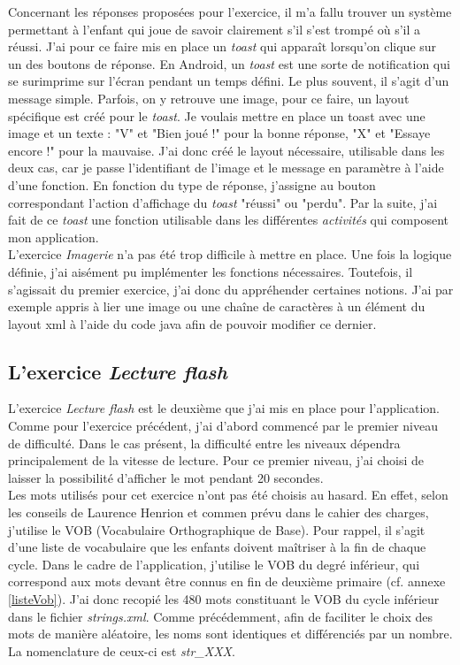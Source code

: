 Concernant les réponses proposées pour l'exercice, il m'a fallu trouver un système permettant à l'enfant qui joue de savoir clairement s'il s'est trompé où s'il a réussi. J'ai pour ce faire mis en place un \textit{toast} qui apparaît lorsqu'on clique sur un des boutons de réponse. En Android, un \textit{toast} est une sorte de notification qui se surimprime sur l'écran pendant un temps défini. Le plus souvent, il s'agit d'un message simple. Parfois, on y retrouve une image, pour ce faire, un layout spécifique est créé pour le \textit{toast}. Je voulais mettre en place un toast avec une image et un texte : "V" et "Bien joué !" pour la bonne réponse, "X" et "Essaye encore !" pour la mauvaise. J'ai donc créé le layout nécessaire, utilisable dans les deux cas, car je passe l'identifiant de l'image et le message en paramètre à l'aide d'une fonction. En fonction du type de réponse, j'assigne au bouton correspondant l'action d'affichage du \textit{toast} "réussi" ou "perdu". Par la suite, j'ai fait de ce \textit{toast} une fonction utilisable dans les différentes \textit{activités} qui composent mon application.\\

L'exercice \textit{Imagerie} n'a pas été trop difficile à mettre en place. Une fois la logique définie, j'ai aisément pu implémenter les fonctions nécessaires. Toutefois, il s'agissait du premier exercice, j'ai donc du appréhender certaines notions. J'ai par exemple appris à lier une image ou une chaîne de caractères à un élément du layout xml à l'aide du code java afin de pouvoir modifier ce dernier.

\subsection{L'exercice \textit{Lecture flash}}
L'exercice \textit{Lecture flash} est le deuxième que j'ai mis en place pour l'application. Comme pour l'exercice précédent, j'ai d'abord commencé par le premier niveau de difficulté. Dans le cas présent, la difficulté entre les niveaux dépendra principalement de la vitesse de lecture. Pour ce premier niveau, j'ai choisi de laisser la possibilité d'afficher le mot pendant 20 secondes.\\

Les mots utilisés pour cet exercice n'ont pas été choisis au hasard. En effet, selon les conseils de Laurence Henrion et commen prévu dans le cahier des charges, j'utilise le VOB (Vocabulaire Orthographique de Base). Pour rappel, il s'agit d'une liste de vocabulaire que les enfants doivent maîtriser à la fin de chaque cycle. Dans le cadre de l'application, j'utilise le VOB du degré inférieur, qui correspond aux mots devant être connus en fin de deuxième primaire (cf. annexe \ref{listeVob}). J'ai donc recopié les 480 mots constituant le VOB du cycle inférieur dans le fichier \textit{strings.xml}. Comme précédemment, afin de faciliter le choix des mots de manière aléatoire, les noms sont identiques et différenciés par un nombre. La nomenclature de ceux-ci est \textit{str\_XXX}. \\

